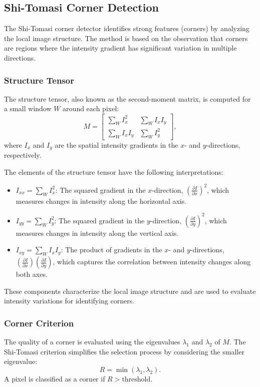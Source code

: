 \documentclass[11pt, conference, letterpaper]{IEEEtran}
\begin{document}
\subsection{Shi-Tomasi Corner Detection}
The Shi-Tomasi corner detector identifies strong features (corners) by analyzing the local image structure. The method is based on the observation that corners are regions where the intensity gradient has significant variation in multiple directions.

\subsubsection{Structure Tensor}
The structure tensor, also known as the second-moment matrix, is computed for a small window \(W\) around each pixel:
\begin{equation}
M = \begin{bmatrix}
\sum_W I_x^2 & \sum_W I_x I_y \\
\sum_W I_x I_y & \sum_W I_y^2
\end{bmatrix},
\end{equation}
where \(I_x\) and \(I_y\) are the spatial intensity gradients in the \(x\)- and \(y\)-directions, respectively.

The elements of the structure tensor have the following interpretations:
\begin{itemize}
    \item \(I_{xx} = \sum_W I_x^2\): The squared gradient in the \(x\)-direction, \((\frac{\partial I}{\partial x})^2\), which measures changes in intensity along the horizontal axis.
    \item \(I_{yy} = \sum_W I_y^2\): The squared gradient in the \(y\)-direction, \((\frac{\partial I}{\partial y})^2\), which measures changes in intensity along the vertical axis.
    \item \(I_{xy} = \sum_W I_x I_y\): The product of gradients in the \(x\)- and \(y\)-directions, \((\frac{\partial I}{\partial x})(\frac{\partial I}{\partial y})\), which captures the correlation between intensity changes along both axes.
\end{itemize}

These components characterize the local image structure and are used to evaluate intensity variations for identifying corners.


\subsubsection{Corner Criterion}
The quality of a corner is evaluated using the eigenvalues \(\lambda_1\) and \(\lambda_2\) of \(M\). The Shi-Tomasi criterion simplifies the selection process by considering the smaller eigenvalue:
\begin{equation}
R = \min(\lambda_1, \lambda_2).
\end{equation}
A pixel is classified as a corner if \(R > \text{threshold}\).
\end{document}
